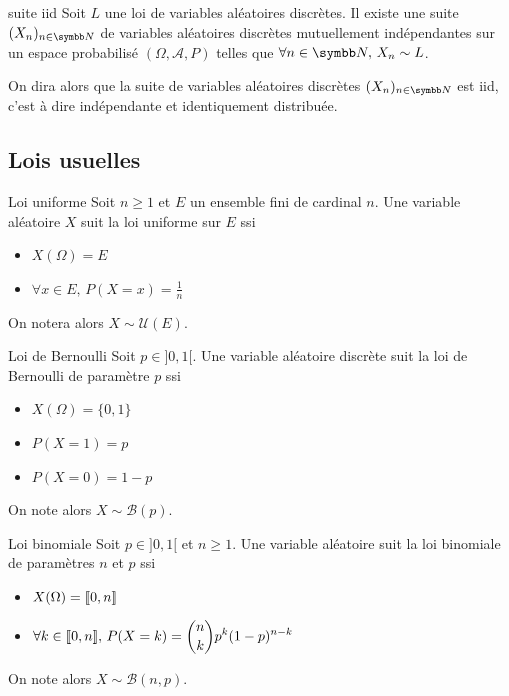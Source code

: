 \begin{corollaire}{suite iid}{}
    Soit $L$ une loi de variables aléatoires discrètes. Il existe une suite 
    $(X_n)_{n \in \N}$ de variables aléatoires discrètes mutuellement indépendantes
    sur un espace probabilisé $(\Omega, \mathcal A, P)$ telles que $\forall n \in \N, \, X_n \sim L$.

    On dira alors que la suite de variables aléatoires discrètes $(X_n)_{n \in \N}$ 
    est iid, c'est à dire indépendante et identiquement distribuée.
\end{corollaire}

\subsection{Lois usuelles}

\begin{definition}{Loi uniforme}{}
    Soit $n \geqslant 1$ et $E$ un ensemble fini de cardinal $n$. Une variable aléatoire $X$ suit la 
    loi uniforme sur $E$ ssi 
    \begin{itemize}
        \item $X(\Omega) = E$
        \item $\forall x \in E, \, P(X = x) = \frac 1 n$
    \end{itemize}

    On notera alors $X \sim \mathcal U(E)$.
\end{definition}


\begin{definition}{Loi de Bernoulli}{}
    Soit $p \in ]0, 1[$. Une variable aléatoire discrète suit la loi de Bernoulli de paramètre 
    $p$ ssi 
    \begin{itemize}
        \item $X(\Omega) = \{0, 1\}$
        \item $P(X = 1) = p$ 
        \item $P(X = 0) = 1 - p$
    \end{itemize}
    On note alors $X \sim \mathcal B(p)$.
\end{definition}

\begin{definition}{Loi binomiale}{}
    Soit $p \in ]0, 1[$ et $n \geqslant 1$. Une variable aléatoire suit la loi binomiale de 
    paramètres $n$ et $p$ ssi 
    \begin{itemize}
        \item $X(\Omega) = [\![0, n]\!]$
        \item $\displaystyle \forall k \in [\![0, n]\!], \, P(X = k) = \binom n k p^k (1 - p)^{n - k}$
    \end{itemize}
    On note alors $X \sim \mathcal B(n, p)$.
\end{definition}


